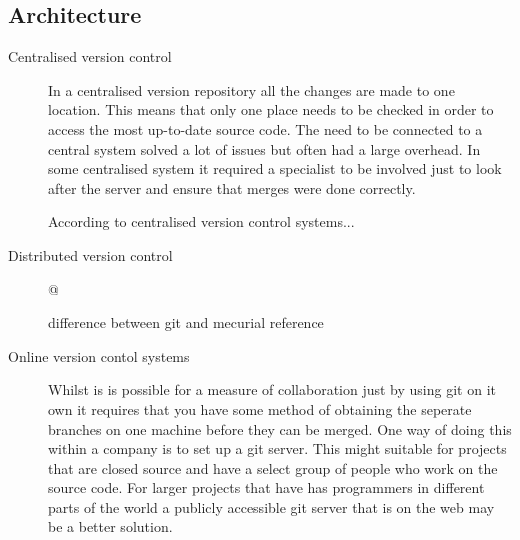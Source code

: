 \subsection{Architecture}
\begin{description}

  \item [Centralised version control] 
  In a centralised version repository all the changes are made to one location.  This means that only one place needs to be checked in order to access the most up-to-date source code. The need to be connected to a central system solved a lot of issues but often had a large overhead.  In some centralised system it required a specialist to be involved just to look after the server and ensure that merges were done correctly.

  According to \cite{Bertino2012} centralised version control systems...
  \item [Distributed version control] 
    

  @%

  difference between git and mecurial reference
  \item [Online version contol systems]  
  Whilst is is possible for a measure of collaboration just by using git on it own it requires that you have some method of obtaining the seperate branches on one machine before they can be merged.  One way of doing this within a company is to set up a git server.  This might suitable for projects that are closed source and have a select group of people who work on the source code.  For larger projects that have has programmers in different parts of the world a publicly accessible git server that is on the web may be a better solution.    

  
\end{description}

